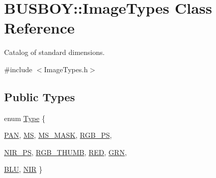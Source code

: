\hypertarget{classBUSBOY_1_1ImageTypes}{
\section{BUSBOY::ImageTypes Class Reference}
\label{classBUSBOY_1_1ImageTypes}
}


Catalog of standard dimensions.  


{\ttfamily \#include $<$ImageTypes.h$>$}\subsection*{Public Types}
\begin{DoxyCompactItemize}
\item 
enum \hyperlink{classBUSBOY_1_1ImageTypes_a3ce0616eb5317335a3b17bd46d56138b}{Type} \{ \par
\hyperlink{classBUSBOY_1_1ImageTypes_a3ce0616eb5317335a3b17bd46d56138ba7a4363f0a722777dfbfa0f8850cc8647}{PAN}, 
\hyperlink{classBUSBOY_1_1ImageTypes_a3ce0616eb5317335a3b17bd46d56138bab8f12cc577f140ea59d02392bd73c78c}{MS}, 
\hyperlink{classBUSBOY_1_1ImageTypes_a3ce0616eb5317335a3b17bd46d56138ba25f1d23f91ba0aee507bf127cf842cd8}{MS\_\-MASK}, 
\hyperlink{classBUSBOY_1_1ImageTypes_a3ce0616eb5317335a3b17bd46d56138bab4c008a3635a15158b236acc649084ab}{RGB\_\-PS}, 
\par
\hyperlink{classBUSBOY_1_1ImageTypes_a3ce0616eb5317335a3b17bd46d56138baaa7914d33c9dd48a2727d958ad51de5e}{NIR\_\-PS}, 
\hyperlink{classBUSBOY_1_1ImageTypes_a3ce0616eb5317335a3b17bd46d56138bab5486382a041b6d3e25c3b7606cf8e40}{RGB\_\-THUMB}, 
\hyperlink{classBUSBOY_1_1ImageTypes_a3ce0616eb5317335a3b17bd46d56138ba575c9b6cf0f977b202a1ba506b59f215}{RED}, 
\hyperlink{classBUSBOY_1_1ImageTypes_a3ce0616eb5317335a3b17bd46d56138ba9980081229800c761a3370d58f15ea99}{GRN}, 
\par
\hyperlink{classBUSBOY_1_1ImageTypes_a3ce0616eb5317335a3b17bd46d56138bacae0801289a55455842fccd556d5d7eb}{BLU}, 
\hyperlink{classBUSBOY_1_1ImageTypes_a3ce0616eb5317335a3b17bd46d56138ba68a2f66136bb061d528bbe55452e18a5}{NIR}
 \}
\end{DoxyCompactItemize}
